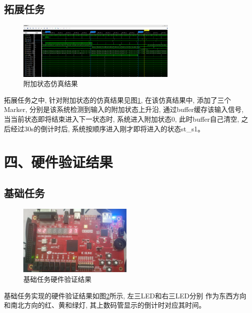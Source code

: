 \documentclass{article}
\newcommand{\fourhao}{\fontsize{14pt}{\baselineskip}\selectfont} %
\newcommand{\xiaosihao}{\fontsize{12pt}{\baselineskip}\selectfont} %
\begin{document}
\subsection*{拓展任务}
\begin{figure}[htbp]
    \centering
    \includegraphics[width=0.7\textwidth]{image/2024-06-19-17-08-24.png}
    \caption{附加状态仿真结果}
    \label{image_addition_sim}
\end{figure}
拓展任务之中, 针对附加状态的仿真结果见图\ref{image_addition_sim}, 在该仿真结果中, 添加了三个Marker, 分别是该系统检测到输入的附加状态上升沿, 通过buffer缓存该输入信号, 当当前状态即将结束进入下一状态时, 系统进入附加状态0, 此时buffer自己清空, 之后经过30s的倒计时后, 系统按顺序进入刚才即将进入的状态st\_s1。
\section*{\fourhao 四、硬件验证结果}
\xiaosihao
{}
\subsection*{基础任务}
\begin{figure}[htbp]
    \centering
    \includegraphics[width=0.5\textwidth]{image/2024-06-19-14-07-53.png}
    \caption{基础任务硬件验证结果}
    \label{image_base_verify}
\end{figure}
基础任务实现的硬件验证结果如图\ref{image_base_verify}所示, 左三LED和右三LED分别
作为东西方向和南北方向的红、黄和绿灯, 其上数码管显示的倒计时对应其时间。
\end{document}
